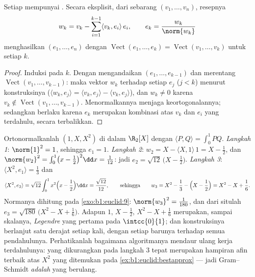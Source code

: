 \begin{theorem}\label{thm:b1:euclid:gramschmidt}
Setiap  mempunyai  . Secara eksplisit, dari sebarang
 $(v_1, \dots, v_n)$, resepnya
\[
w_k = v_k - \sum_{i=1}^{k-1} \langle v_k, e_i\rangle\, e_i ,
\qquad
e_k = \frac{w_k}{\norm{w_k}}
\]
menghasilkan   $(e_1, \dots, e_n)$ dengan
$\operatorname{Vect}(e_1, \dots, e_k) = \operatorname{Vect}(v_1,
\dots, v_k)$ untuk setiap $k$.
\end{theorem}

\begin{proof}
Induksi pada $k$. Dengan mengandaikan $(e_1, \dots, e_{k-1})$ 
dan merentang $\operatorname{Vect}(v_1, \dots, v_{k-1})$: maka vektor
$w_k$  terhadap setiap $e_j$ ($j < k$) menurut konstruksinya
($\langle w_k, e_j \rangle = \langle v_k, e_j\rangle - \langle v_k,
e_j\rangle$), dan $w_k \neq 0$ karena $v_k \notin
\operatorname{Vect}(v_1, \dots, v_{k-1})$. Menormalkannya menjaga
keortogonalannya; sedangkan   berlaku karena $e_k$ merupakan
kombinasi atas $v_k$ dan $e_i$ yang terdahulu, secara terbalikkan.
\end{proof}

\begin{example}
\label{ex:b1:euclid:legendre}
Ortonormalkanlah $(1, X, X^2)$ di dalam $\R_2[X]$ dengan $\langle P,
Q\rangle = \int_0^1 PQ$. \emph{Langkah 1}: $\norm{1}^2 = 1$, sehingga
$e_1 = 1$. \emph{Langkah 2}: $w_2 = X - \langle X, 1\rangle\,1 = X -
\frac12$, dan $\norm{w_2}^2 = \int_0^1\bigl(x - \frac12\bigr)^2
\dd x = \frac1{12}$: jadi $e_2 = \sqrt{12}\,\bigl(X - \frac12\bigr)$.
\emph{Langkah 3}: $\langle X^2, e_1\rangle = \frac13$ dan
\[
\langle X^2, e_2\rangle
= \sqrt{12}\int_0^1 x^2\Bigl(x - \frac12\Bigr)\dd x
= \frac{\sqrt{12}}{12},
\qquad\text{sehingga}\qquad
w_3 = X^2 - \frac13 - \Bigl(X - \frac12\Bigr)
= X^2 - X + \frac16 .
\]
Normanya dihitung pada \cref{exo:b1:euclid:9}: $\norm{w_3}^2 =
\frac1{180}$, dan dari situlah $e_3 = \sqrt{180}\,\bigl(X^2 - X +
\frac16\bigr)$. Adapun  $1$, $X - \frac12$, $X^2 - X +
\frac16$ merupakan, sampai skalanya, \emph{ Legendre} yang pertama
pada  $\intcc{0}{1}$; dan konstruksinya berlanjut satu
derajat setiap kali, dengan setiap  barunya  terhadap semua
pendahulunya. Perhatikanlah bagaimana algoritmanya mendaur ulang kerja terdahulunya:
 yang dikurangkan pada langkah 3 tepat merupakan hampiran afin
terbaik atas $X^2$ yang ditemukan pada \cref{ex:b1:euclid:bestapprox}
--- jadi Gram--Schmidt \emph{adalah}  yang berulang.
\end{example}


